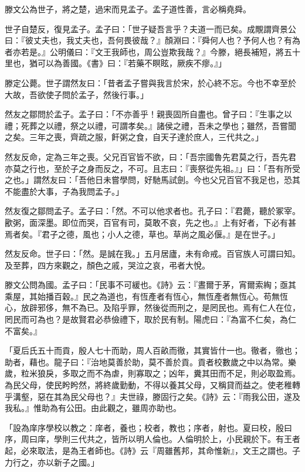 
\begin{pinyinscope}
滕文公為世子，將之楚，過宋而見孟子。孟子道性善，言必稱堯舜。

世子自楚反，復見孟子。孟子曰：「世子疑吾言乎？夫道一而已矣。成覸謂齊景公曰：『彼丈夫也，我丈夫也，吾何畏彼哉？』顏淵曰：『舜何人也？予何人也？有為者亦若是。』公明儀曰：『文王我師也，周公豈欺我哉？』今滕，絕長補短，將五十里也，猶可以為善國。《書》曰：『若藥不瞑眩，厥疾不瘳。』」

滕定公薨。世子謂然友曰：「昔者孟子嘗與我言於宋，於心終不忘。今也不幸至於大故，吾欲使子問於孟子，然後行事。」

然友之鄒問於孟子。孟子曰：「不亦善乎！親喪固所自盡也。曾子曰：『生事之以禮；死葬之以禮，祭之以禮，可謂孝矣。』諸侯之禮，吾未之學也；雖然，吾嘗聞之矣。三年之喪，齊疏之服，飦粥之食，自天子達於庶人，三代共之。」

然友反命，定為三年之喪。父兄百官皆不欲，曰：「吾宗國魯先君莫之行，吾先君亦莫之行也，至於子之身而反之，不可。且志曰：『喪祭從先祖。』」曰：「吾有所受之也。」謂然友曰：「吾他日未嘗學問，好馳馬試劍。今也父兄百官不我足也，恐其不能盡於大事，子為我問孟子。」

然友復之鄒問孟子。孟子曰：「然。不可以他求者也。孔子曰：『君薨，聽於冢宰。歠粥，面深墨。即位而哭，百官有司，莫敢不哀，先之也。』上有好者，下必有甚焉者矣。『君子之德，風也；小人之德，草也。草尚之風必偃。』是在世子。」

然友反命。世子曰：「然。是誠在我。」五月居廬，未有命戒。百官族人可謂曰知。及至葬，四方來觀之，顏色之戚，哭泣之哀，弔者大悅。

滕文公問為國。孟子曰：「民事不可緩也。《詩》云：『晝爾于茅，宵爾索綯；亟其乘屋，其始播百穀。』民之為道也，有恆產者有恆心，無恆產者無恆心。苟無恆心，放辟邪侈，無不為已。及陷乎罪，然後從而刑之，是罔民也。焉有仁人在位，罔民而可為也？是故賢君必恭儉禮下，取於民有制。陽虎曰：『為富不仁矣，為仁不富矣。』

「夏后氏五十而貢，殷人七十而助，周人百畝而徹，其實皆什一也。徹者，徹也；助者，藉也。龍子曰：『治地莫善於助，莫不善於貢。貢者校數歲之中以為常。樂歲，粒米狼戾，多取之而不為虐，則寡取之；凶年，糞其田而不足，則必取盈焉。為民父母，使民盻盻然，將終歲勤動，不得以養其父母，又稱貸而益之。使老稚轉乎溝壑，惡在其為民父母也？』夫世祿，滕固行之矣。《詩》云：『雨我公田，遂及我私。』惟助為有公田。由此觀之，雖周亦助也。

「設為庠序學校以教之：庠者，養也；校者，教也；序者，射也。夏曰校，殷曰序，周曰庠，學則三代共之，皆所以明人倫也。人倫明於上，小民親於下。有王者起，必來取法，是為王者師也。《詩》云『周雖舊邦，其命惟新』，文王之謂也。子力行之，亦以新子之國。」


\end{pinyinscope}

